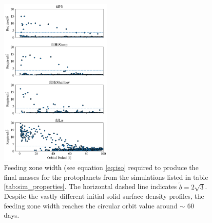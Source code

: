 \documentclass[twocolumn]{aastex63}
\begin{document}
\begin{figure}
\begin{center}
    \includegraphics[width=0.5\textwidth]{figures/surfden_b.png}
    \caption{Feeding zone width (see equation \ref{eq:iso} required to produce the final masses for the protoplanets from the simulations listed in table \ref{tab:sim_properties}. The horizontal dashed line indicates $\tilde{b} = 2 \sqrt{3}$. Despite the vastly different initial solid surface density profiles, the feeding zone width reaches the circular orbit value around $\sim$ 60 days. \label{fig:surfden_b}}
\end{center}
\end{figure}


\end{document}
